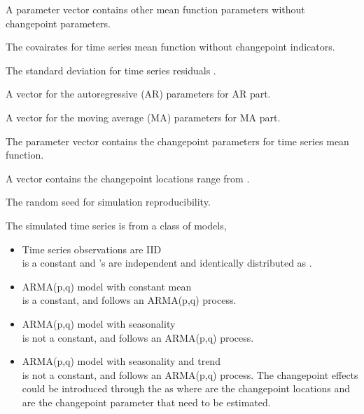 \documentclass[a4paper]{book}
\begin{document}
\begin{Arguments}
\begin{ldescription}
\item[\code{beta}] A parameter vector contains other mean function parameters without changepoint parameters.

\item[\code{XMat}] The covairates for time series mean function without changepoint indicators.

\item[\code{sigma}] The standard deviation for time series residuals .

\item[\code{phi}] A vector for the autoregressive (AR) parameters for AR part.

\item[\code{theta}] A vector for the moving average (MA) parameters for MA part.

\item[\code{Delta}] The parameter vector contains the changepoint parameters for time series mean function.

\item[\code{CpLoc}] A vector contains the changepoint locations range from .

\item[\code{seed}] The random seed for simulation reproducibility.
\end{ldescription}
\end{Arguments}
%
\begin{Details}
The simulated time series  is from a class of models,
\begin{itemize}

\item{} Time series observations are IID \\{}  is a constant
and 's are independent and identically distributed as .
\item{} ARMA(p,q) model with constant mean \\{}  is a constant,
and  follows an ARMA(p,q) process.
\item{} ARMA(p,q) model with seasonality \\{}  is not a constant,
and  follows an ARMA(p,q) process.
\item{} ARMA(p,q) model with seasonality and trend \\{}  is not a constant,
and  follows an ARMA(p,q) process.
The changepoint effects could be introduced through the  as
where  are the changepoint locations and
 are the changepoint parameter that need to be estimated.

\end{itemize}

\end{Details}
\end{document}
